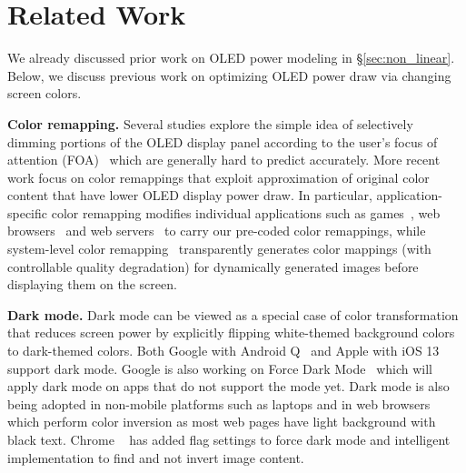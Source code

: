 \section{Related Work}
\label{sec:related}

We already discussed prior work on OLED power modeling in
\S\ref{sec:non_linear}. Below, we discuss previous work on optimizing
OLED power draw via changing screen colors.

{\bf Color remapping.}
Several studies explore the simple idea of selectively dimming portions
of the OLED display panel according to the user's focus of attention
(FOA)~\cite{tan:ubicom13,chen:hotpower14} which are generally hard to
predict accurately.
%
More recent work focus on color remappings that exploit
approximation of original color content that have lower OLED display
power draw. In particular, application-specific color remapping
modifies individual applications such as games~\cite{anand:mobisys11},
web browsers~\cite{dong:ispled09,li:esec15} and web
servers~\cite{li:icse2014} to carry our pre-coded color remappings,
while system-level color remapping~\cite{crayon:eurosys16}
transparently generates color mappings (with controllable
quality degradation) for dynamically generated images before
displaying them on the screen.

{\bf Dark mode.}
Dark mode can be viewed as a special case
of color transformation that reduces screen power
by explicitly flipping white-themed background colors to dark-themed colors.
Both Google with Android Q~\cite{darkmode:androidQ} and
Apple with iOS 13~\cite{darkmode:iOS13_1,darkmode:iOS13_2} support
dark mode.  Google is also working on Force Dark
Mode~\cite{darkmode:forcedark} which will apply dark mode on apps
that do not support the mode yet.
%
Dark mode is also being adopted in non-mobile platforms such as
laptops and in web browsers~\cite{darkmode:web_browsers} which
perform color inversion as most web pages have light
background with black text.
Chrome ~\cite{darkmode:chrome} has added flag settings to force dark mode
and intelligent implementation to find and not invert image content.

